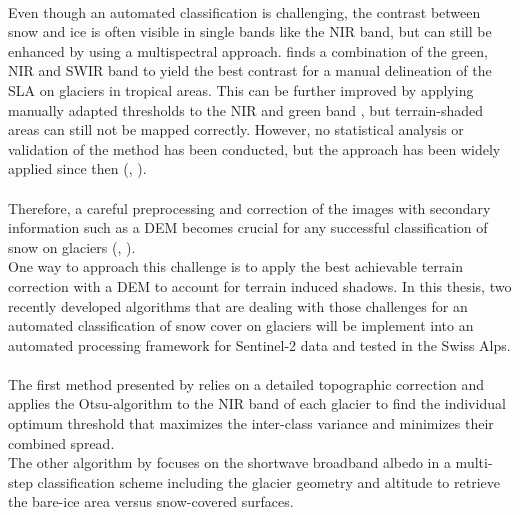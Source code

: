 \documentclass[12pt]{article}
\begin{document}
\\
Even though an automated classification is challenging, the contrast between snow and ice is often visible in single bands like the NIR band, but can still be enhanced by using a multispectral approach.
\cite{Rabatel2012} finds a combination of the green, NIR and SWIR band to yield the best contrast for a manual delineation of the SLA on glaciers in tropical areas. This can be further improved by applying manually adapted thresholds to the NIR and green band \cite{Rabatel2012}, but terrain-shaded areas can still not be mapped correctly. However, no statistical analysis or validation of the method has been conducted, but the approach has been widely applied since then (\cite{Veettil2015},  \cite{Khan2015}).
\\
\\
 Therefore, a careful preprocessing and correction of the images with secondary information such as a DEM becomes crucial for any successful classification of snow on glaciers (\cite{Bippus2011}, \cite{Paul2016}).
\\
 One way to approach this challenge is to apply the best achievable terrain correction with a DEM to account for terrain induced shadows. In this thesis, two recently developed algorithms that are dealing with those challenges for an automated classification of snow cover on glaciers will be implement  into an automated processing framework for Sentinel-2 data and tested in the Swiss Alps.\\
\\
The first method presented by \cite{Rastner2017} relies on a detailed topographic correction and applies the Otsu-algorithm to the NIR band of each glacier to find the individual optimum threshold that maximizes the inter-class variance and minimizes their combined spread. \\
The other algorithm by \cite{Naegeli2018} focuses on the shortwave broadband albedo in a multi-step classification scheme including the glacier geometry and altitude to retrieve the bare-ice area versus snow-covered surfaces.
\end{document}
